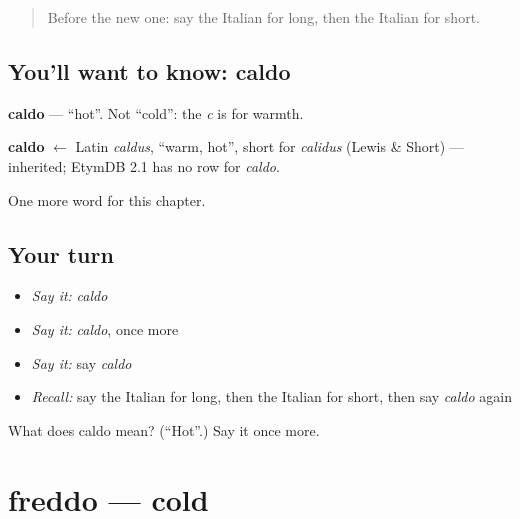 \label{lesson:IT-C73-caldo}



\begin{quote}
Before the new one: say the Italian for long, then the Italian for short.
\end{quote}

\subsection*{You'll want to know: caldo}
\textbf{caldo} — \textquotedblleft{}hot\textquotedblright{}. Not \textquotedblleft{}cold\textquotedblright{}: the \emph{c} is for warmth.

\begin{cousinweb}
\textbf{caldo} $\leftarrow$ Latin \emph{caldus}, \textquotedblleft{}warm, hot\textquotedblright{}, short for \emph{calidus} (Lewis \& Short) — inherited; EtymDB 2.1 has no row for \emph{caldo}.
\end{cousinweb}

\begin{grammarlens}[title={What you've built}]
One more word for this chapter.
\end{grammarlens}

\subsection*{Your turn}
\begin{itemize}
\raggedright
  \item \emph{Say it:} \emph{caldo}
  \item \emph{Say it:} \emph{caldo}, once more
  \item \emph{Say it:} say \emph{caldo}
  \item \emph{Recall:} say the Italian for long, then the Italian for short, then say \emph{caldo} again
\end{itemize}

\begin{tcolorbox}[breakable,colback=teal!4,colframe=teal!35!black,title={Before you move on}]
What does caldo mean? (\textquotedblleft{}Hot\textquotedblright{}.) Say it once more.
\end{tcolorbox}
\section[freddo]{freddo — cold}

\label{lesson:IT-C73-freddo}



